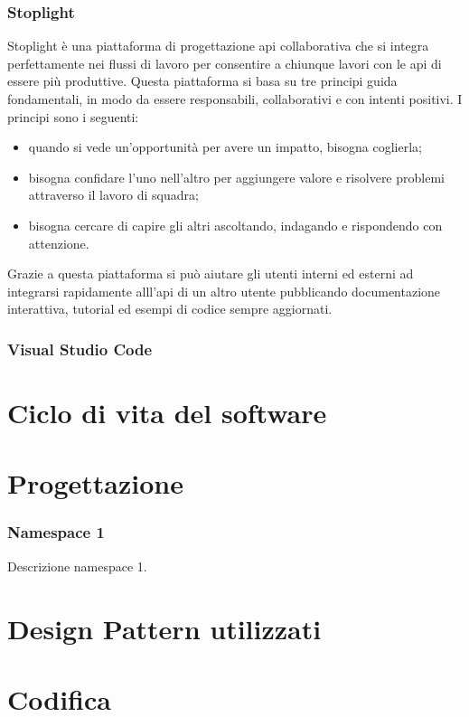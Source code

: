 \subsubsection{Stoplight}

Stoplight è una piattaforma di progettazione \gls{api} collaborativa che si integra perfettamente nei flussi di lavoro per consentire a chiunque lavori con le \gls{api} di essere più produttive. Questa piattaforma si basa su tre principi guida fondamentali, in modo da essere responsabili, collaborativi e con intenti positivi. I principi sono i seguenti:
\begin{itemize}
	\item quando si vede un'opportunità per avere un impatto, bisogna coglierla;
	\item bisogna confidare l'uno nell'altro per aggiungere valore e risolvere problemi attraverso il lavoro di squadra;
	\item bisogna cercare di capire gli altri ascoltando, indagando e rispondendo con attenzione.
\end{itemize}
Grazie a questa piattaforma si può aiutare gli utenti interni ed esterni ad integrarsi rapidamente alll'\gls{api} di un altro utente pubblicando documentazione interattiva, tutorial ed esempi di codice sempre aggiornati.

\subsubsection{Visual Studio Code}

\section{Ciclo di vita del software}
\label{sec:ciclo-vita-software}

\section{Progettazione}
\label{sec:progettazione}

\subsubsection{Namespace 1} %
Descrizione namespace 1.

\begin{namespacedesc}
\end{namespacedesc}


\section{Design Pattern utilizzati}

\section{Codifica}
